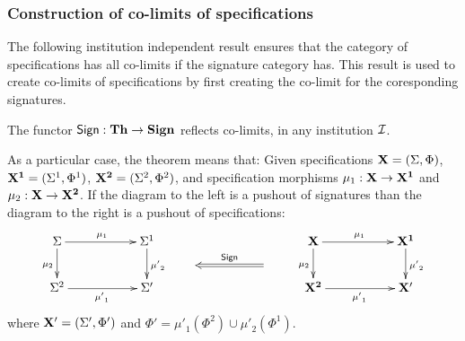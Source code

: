 %

\subsubsection{Construction of co-limits of specifications}
The following institution independent result ensures that the category of
specifications has all co-limits if the signature category has.  This
result is used to create co-limits of specifications by first creating the
co-limit for the coresponding signatures.


\begin{theorem} \cite{inst}
\label{teo:reflects}
The functor  ${\sf {Sign}}: {\bf Th} \to {\bf Sign}$ reflects co-limits, in any institution ${\mathcal{I}}$.
\end{theorem}
As a particular case, the theorem means that:
Given specifications ${\bf X}=(\Sigma,\Phi)$, ${\bf X^1}=(\Sigma^1,\Phi^1)$, ${\bf X^2}=(\Sigma^2,\Phi^2)$, and specification morphisms $\mu_1:{\bf X} \to {\bf X^1}$ and $\mu_2:{\bf X} \to {\bf X^2}$.
If the  diagram to the left is a pushout of signatures than the diagram to
the right is a pushout of specifications:
\[\xymatrix@R=0.3cm{%
\Sigma \ar[dd]_{\mu_{2}} \ar[rr]^{\mu_1}&& \Sigma^1 \ar[dd]^{{\mu'}_2} &&&&
   \thr{X} \ar[dd]_{\mu_{2}} \ar[rr]^{\mu_1} && \thr{X^1} \ar[dd]^{{\mu'}_2}
   \\
      && &&& \ar@{=>}[ll]_{\fu{Sign}} &\\
\Sigma^2 \ar[rr]_{{\mu'}_1}		&& \Sigma' &&&&
\thr{X^2} \ar[rr]_{{\mu'}_1}		&& \thr{X'} \\
}
\]
where ${\bf X'}=
(\Sigma',\Phi')$ and $\Phi'=  {\mu'}_{1}(\Phi^2) \cup
{\mu'}_{2}(\Phi^1)$.



